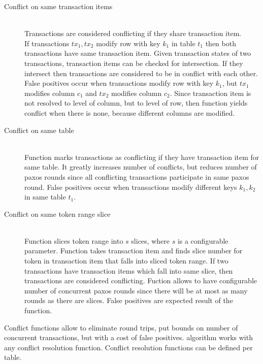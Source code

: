 \begin{description}
\label{conflictFunctions}
\item[Conflict on same transaction items] \hfill \\
	Transactions are considered conflicting if they share transaction item. 
	\\
	If transactions $tx_{1}, tx{_2}$ modify row with key $k_{1}$ in table $t_{1}$ then both transactions have same transaction item. Given transaction states of two transactions, transaction items can be checked for intersection.
	If they intersect then transactions are considered to be in conflict with each other. \\
	False positives occur when transactions modify row with key $k_{1}$, but $tx_{1}$ modifies column $c_{1}$ and $tx_{2}$ modifies column $c_{2}$. Since transaction item is not resolved to level of column, but to level of row, then function yields conflict when there is none, because different columns are modified.	
\item[Conflict on same table] \hfill \\
		Function marks transactions as conflicting if they have transaction item for same table. It greatly increases number of conflicts, but reduces number of paxos rounds since all conflicting transactions participate in same paxos round.
		False positives occur when transactions modify different keys $k_{1}, k_{2}$ in same table $t_{1}$. 
\item[Conflict on same token range slice] \hfill \\
		Function slices token range into $s$ slices, where $s$ is a configurable parameter. Function takes transaction item and finds slice number for token in transaction item that falls into sliced token range. If two transactions have transaction items which fall into same slice, then transactions are considered conflicting.
		Fuction allows to have configurable number of concurrent paxos rounds since there will be at most as many rounds as there are slices. False positives are expected result of the function.
\end{description}

Conflict functions allow to eliminate round trips, put bounds on number of concurrent transactions, but with a cost of false positives. \mpt algorithm works with any conflict resolution function. Conflict resolution functions can be defined per table.
